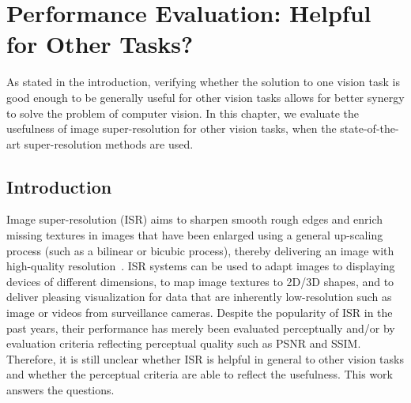 \chapter{Performance Evaluation: Helpful for Other Tasks?}
\label{ch:SR4VT}

As stated in the introduction, verifying whether the solution to one vision task is good enough to be generally useful for other vision tasks allows for better synergy to solve the problem of computer vision.   In this chapter, we evaluate the usefulness of image super-resolution for other vision tasks, when the state-of-the-art super-resolution methods are used. 

\section{Introduction}

Image super-resolution (ISR) aims to sharpen smooth rough edges and
enrich missing textures in images that have been enlarged using a
general up-scaling process (such as a bilinear or bicubic process),
thereby delivering an image with high-quality
resolution~\citep{Freeman-CGA-2002, Yang-TIP-2010, Zeyde-CS-2012,
  Timofte-ICCV-2013, Dong-ECCV-2014, JOR:EG15}. ISR systems can be
used to adapt images to displaying devices of different dimensions, to
map image textures to 2D/3D shapes, and to deliver pleasing
visualization for data that are inherently low-resolution such as
image or videos from surveillance cameras.  Despite the popularity of
ISR in the past years, their performance has merely been evaluated
perceptually and/or by evaluation criteria reflecting perceptual
quality such as PSNR and SSIM. Therefore, it is still unclear whether
ISR is helpful in general to other vision tasks and whether the
perceptual criteria are able to reflect the usefulness. 
This work answers the questions.

